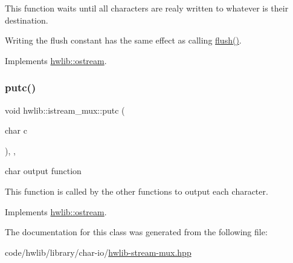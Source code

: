 This function waits until all characters are realy written to whatever is their destination.

Writing the flush constant has the same effect as calling \hyperlink{classhwlib_1_1istream__mux_a33f8cfde26e1c3dcf2867c2e0fce3582}{flush()}. 

Implements \hyperlink{classhwlib_1_1ostream_a5f43f08159d2733e02805f134598f96a}{hwlib\+::ostream}.

\mbox{\label{classhwlib_1_1istream__mux_a34deb0a6755b04923c4c8206452af37b}} 
\subsubsection{\texorpdfstring{putc()}{putc()}}
{\footnotesize\ttfamily void hwlib\+::istream\+\_\+mux\+::putc (\begin{DoxyParamCaption}\item[{char}]{c }\end{DoxyParamCaption})\hspace{0.3cm}{\ttfamily [inline]}, {\ttfamily [override]}, {\ttfamily [virtual]}}

char output function

This function is called by the other functions to output each character. 

Implements \hyperlink{classhwlib_1_1ostream_a3b2b77c9e933b76bd6ddd85b9883a31b}{hwlib\+::ostream}.



The documentation for this class was generated from the following file\+:\begin{DoxyCompactItemize}
\item 
code/hwlib/library/char-\/io/\hyperlink{hwlib-stream-mux_8hpp}{hwlib-\/stream-\/mux.\+hpp}\end{DoxyCompactItemize}
